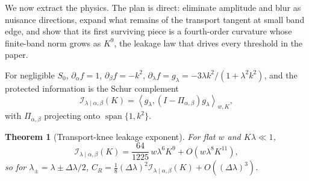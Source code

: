 \documentclass[11pt]{article}
\newtheorem{theorem}{Theorem}
\newcommand{\calI}{\mathcal I}
\newcommand{\inner}[2]{\left\langle #1,#2\right\rangle}
\begin{document}
We now extract the physics. The plan is direct: eliminate amplitude and blur as nuisance directions, expand what remains of the transport tangent at small band edge, and show that its first surviving piece is a fourth-order curvature whose finite-band norm grows as $K^9$, the leakage law that drives every threshold in the paper.

For negligible \(S_0\), \(\partial_\alpha f=1\), \(\partial_\beta f=-k^2\), \(\partial_\lambda f=g_\lambda=-3\lambda k^2/(1+\lambda^2k^2)\), and the protected information is the Schur complement
\begin{equation}
\calI_{\lambda\mid\alpha,\beta}(K)=\inner{g_\lambda}{(I-\Pi_{\alpha,\beta})g_\lambda}_{w,K},
\label{eq:conditional-transport}
\end{equation}
with \(\Pi_{\alpha,\beta}\) projecting onto \(\operatorname{span}\{1,k^2\}\).

\begin{theorem}[Transport-knee leakage exponent]
\label{thm:k9}
For flat \(w\) and \(K\lambda\ll1\),
\begin{equation}
\calI_{\lambda\mid\alpha,\beta}(K)=\frac{64}{1225}\,w\lambda^6K^9+O(w\lambda^8K^{11}),
\label{eq:k9}
\end{equation}
so for \(\lambda_\pm=\lambda\pm\Delta\lambda/2\), \(C_R=\tfrac18(\Delta\lambda)^2\calI_{\lambda\mid\alpha,\beta}(K)+O((\Delta\lambda)^3)\).
\end{theorem}
\end{document}
